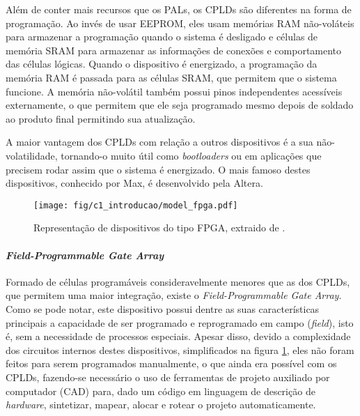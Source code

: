 \documentclass[11pt,a4paper,oneside]{book}
\begin{document}
Al\'em de conter mais recursos que os PALs, os CPLDs s\~ao diferentes na forma de programa\c{c}\~ao.
Ao inv\'es de usar EEPROM, eles usam mem\'orias RAM n\~ao-vol\'ateis para armazenar a programa\c{c}\~ao quando o sistema \'e desligado e c\'elulas de mem\'oria SRAM para armazenar as informa\c{c}\~oes de conex\~oes e comportamento das c\'elulas l\'ogicas.
Quando o dispositivo \'e energizado, a programa\c{c}\~ao da mem\'oria RAM \'e passada para as c\'elulas SRAM, que permitem que o sistema funcione.
A mem\'oria n\~ao-vol\'atil tamb\'em possui pinos independentes acess\'i­veis externamente, o que permitem que ele seja programado mesmo depois de soldado ao produto final permitindo sua atualiza\c{c}\~ao.

A maior vantagem dos CPLDs com rela\c{c}\~ao a outros dispositivos \'e a sua n\~ao-volatilidade, tornando-o muito \'util como \textit{bootloaders} ou em aplica\c{c}\~oes que precisem rodar assim que o sistema \'e energizado.
O mais famoso destes dispositivos, conhecido por Max, \'e desenvolvido pela Altera.

\begin{figure}[h]
\centering
\texttt{[image: fig/c1\_introducao/model\_fpga.pdf]}
\caption{Representa\c{c}\~ao de dispositivos do tipo FPGA, extraido de \cite{Ashenden2008}.}
\label{fig:fpga}
\end{figure}

\paragraph{\textit{Field-Programmable Gate Array}}
Formado de c\'elulas program\'aveis consideravelmente menores que as dos CPLDs, que permitem uma maior integra\c{c}\~ao, existe o \textit{Field-Programmable Gate Array}.
Como se pode notar, este dispositivo possui dentre as suas caracter\'i­sticas principais a capacidade de ser programado e reprogramado em campo (\textit{field}), isto \'e, sem a necessidade de processos especiais.
Apesar disso, devido a complexidade dos circuitos internos destes dispositivos, simplificados na figura \ref{fig:fpga}, eles n\~ao foram feitos para serem programados manualmente, o que ainda era poss\'i­vel com os CPLDs, fazendo-se necess\'ario o uso de ferramentas de projeto auxiliado por computador (CAD) para, dado um c\'odigo em linguagem de descri\c{c}\~ao de \textit{hardware}, sintetizar, mapear, alocar e rotear o projeto automaticamente.
\end{document}

